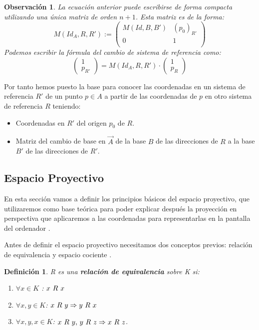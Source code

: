 \documentclass[a4paper,11pt, oneside]{book}
\newtheorem{defi}{Definición}
\newtheorem{obv}{Observación}
\begin{document}
\begin{obv}
La ecuación anterior puede escribirse de forma compacta utilizando una única matriz de orden $n+1$. Esta matriz es de la forma:
\begin{equation}
M(Id_A, R, R') := 
\begin{pmatrix}
M(Id, B, B') & (p_0)_{R'} \\
0 			 & 1 \\
\end{pmatrix}
\end{equation}
Podemos escribir la fórmula del cambio de sistema de referencia como:
\begin{equation}\label{cambio}
\begin{pmatrix}
1 \\
p_{R'}
\end{pmatrix}
 = M(Id_A, R, R')\cdot \begin{pmatrix}
 1 \\
 p_R
 \end{pmatrix}
\end{equation}
\end{obv}

Por tanto hemos puesto la base para conocer las coordenadas en un sistema de referencia $R'$ de un punto $p \in A$ a partir de las coordenadas de $p$ en otro sistema de referencia $R$ teniendo:
\begin{itemize}
	\item Coordenadas en $R'$ del origen $p_0$ de $R$.
	\item Matriz del cambio de base en $\overrightarrow{A}$ de la base $B$ de las direcciones de $R$ a la base $B'$ de las direcciones de $R'$.
\end{itemize}

\subsection{Espacio Proyectivo}

En esta sección vamos a definir los principios básicos del espacio proyectivo, que utilizaremos como base teórica para poder explicar después la proyección en perspectiva que aplicaremos a las coordenadas para representarlas en la pantalla del ordenador \cite{geometria}.


Antes de definir el espacio proyectivo necesitamos dos conceptos previos: relación de equivalencia y espacio cociente \cite{algebra}.

\begin{defi}
	R es una \textbf{relación de equivalencia} sobre K si:
	\begin{enumerate}
	\item $\forall x \in K$	: $x\textup{ }R\textup{ }x$
	\item $\forall x,y \in K$: $x\textup{ }R\textup{ }y \Rightarrow y\textup{ }R\textup{ }x$
	\item $\forall x,y,x \in K$: $x\textup{ }R\textup{ }y \textup{, } y\textup{ }R\textup{ }z \Rightarrow x\textup{ }R\textup{ }z$.
	\end{enumerate}
\end{defi}
\end{document}
